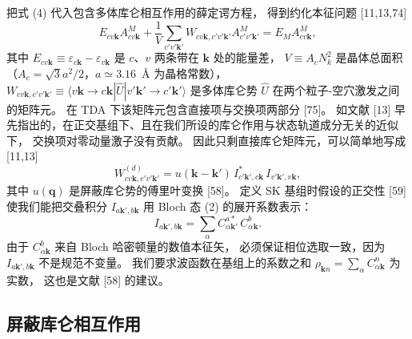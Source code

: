 \documentclass[11pt,a4paper]{ctexart}
\newcommand{\eps}{\varepsilon}
\begin{document}
把式 (4) 代入包含多体库仑相互作用的薛定谔方程，
得到约化本征问题 [11,13,74]
\begin{equation}
E_{cv\mathbf k}A^{M}_{cv\mathbf k}
+\frac{1}{V}\sum_{c'v'\mathbf k'}W_{cv\mathbf k,c'v'\mathbf k'}A^{M}_{c'v'\mathbf k'}
=E_M A^{M}_{cv\mathbf k},
\end{equation}
其中 $E_{cv\mathbf k}\equiv\eps_{c\mathbf k}-\eps_{v\mathbf k}$ 是 $c$、$v$ 两条带在 $\mathbf k$ 处的能量差，
$V\equiv A_cN_k^2$ 是晶体总面积
（$A_c=\sqrt3a^2/2$，$a\simeq3.16$~\AA{} 为晶格常数），
$W_{cv\mathbf k,c'v'\mathbf k'}\equiv\langle v\mathbf k\to c\mathbf k|\hat U|v'\mathbf k'\to c'\mathbf k'\rangle$
是多体库仑势 $\hat U$ 在两个粒子-空穴激发之间的矩阵元。
在 TDA 下该矩阵元包含直接项与交换项两部分 [75]。
如文献 [13] 早先指出的，在正交基组下、且在我们所设的库仑作用与状态轨道成分无关的近似下，
交换项对零动量激子没有贡献。
因此只剩直接库仑矩阵元，可以简单地写成 [11,13]
\begin{equation}
W^{(d)}_{cv\mathbf k,c'v'\mathbf k'}=u(\mathbf k-\mathbf k')\,
I^{*}_{c'\mathbf k',c\mathbf k}\,I_{v'\mathbf k',v\mathbf k},
\end{equation}
其中 $u(\mathbf q)$ 是屏蔽库仑势的傅里叶变换 [58]。
定义 SK 基组时假设的正交性 [59] 使我们能把交叠积分 $I_{a\mathbf k',b\mathbf k}$
用 Bloch 态 (2) 的展开系数表示：
\begin{equation}
I_{a\mathbf k',b\mathbf k}=\sum_{\alpha}C^{a*}_{\alpha\mathbf k'}\,C^{b}_{\alpha\mathbf k}.
\end{equation}
由于 $C^{b}_{\alpha\mathbf k}$ 来自 Bloch 哈密顿量的数值本征矢，
必须保证相位选取一致，因为 $I_{a\mathbf k',b\mathbf k}$ 不是规范不变量。
我们要求波函数在基组上的系数之和 $\rho_{\mathbf k n}=\sum_\alpha C^{n}_{\alpha\mathbf k}$ 为实数，
这也是文献 [58] 的建议。

\subsection{屏蔽库仑相互作用}
\end{document}
